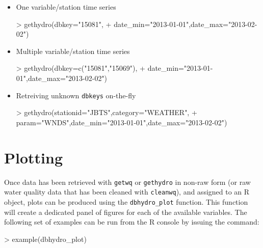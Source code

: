 \documentclass[12pt,notitlepage]{article}
\begin{document}
\begin{itemize}
\item One variable/station time series
\begin{Schunk}
\begin{Sinput}
> gethydro(dbkey="15081",
+          date_min="2013-01-01",date_max="2013-02-02")
\end{Sinput}
\end{Schunk}

\item Multiple variable/station time series
\begin{Schunk}
\begin{Sinput}
> gethydro(dbkey=c("15081","15069"),
+          date_min="2013-01-01",date_max="2013-02-02")
\end{Sinput}
\end{Schunk}

\item Retreiving unknown \texttt{dbkeys} on-the-fly

\begin{Schunk}
\begin{Sinput}
> gethydro(stationid="JBTS",category="WEATHER",
+          param="WNDS",date_min="2013-01-01",date_max="2013-02-02")
\end{Sinput}
\end{Schunk}

\end{itemize}

\section{Plotting}

Once data has been retrieved with \verb|getwq| or \texttt{gethydro} in non-raw form (or raw water quality data that has been cleaned with \verb|cleanwq|), and assigned to an R object, plots can be produced using the \verb|dbhydro_plot| function. This function will create a dedicated panel of figures for each of the available variables. The following set of examples can be run from the R console by issuing the command:

\begin{Schunk}
\begin{Sinput}
> example(dbhydro_plot)
\end{Sinput}
\end{Schunk}
\end{document}
